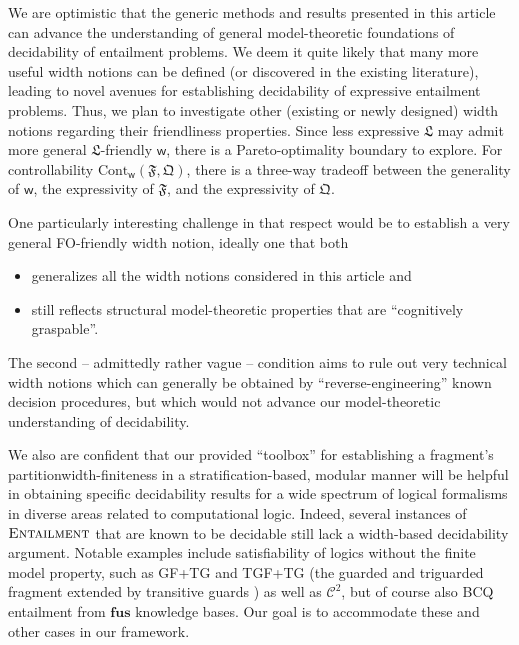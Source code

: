 \documentclass[10pt,a4paper]{amsart}
\theoremstyle{definition}
\numberwithin{equation}{section}
\theoremstyle{plain}
\theoremstyle{definition}
\theoremstyle{myexample}
\theoremstyle{plain}
\theoremstyle{definition}
\newcommand{\fcn}[1]{\mathsf{#1}}
\newcommand{\fus}{\mathbf{fus}}
\begin{document}
We are optimistic that the generic methods and results presented in this article can advance the understanding of general model-theoretic foundations of decidability of entailment problems. We deem it quite likely that many more useful width notions can be defined (or discovered in the existing literature), leading to novel avenues for establishing decidability of expressive entailment problems. Thus, we plan to investigate other (existing or newly designed) width notions regarding their friendliness properties. Since less expressive $\mathfrak{L}$ may admit more general $\mathfrak{L}$-friendly $\fcn{w}$, there is a Pareto-optimality boundary to explore. For controllability $\mathrm{Cont}_\fcn{w}(\mathfrak{F},\mathfrak{Q})$, there is a three-way tradeoff between the generality of $\fcn{w}$, the expressivity of $\mathfrak{F}$, and the expressivity of $\mathfrak{Q}$. 

\smallskip

One particularly interesting challenge in that respect would be to establish a very general FO-friendly width notion, ideally one that both 
\begin{itemize}
\item
generalizes all the width notions considered in this article and 
\item
still reflects structural model-theoretic properties that are ``cognitively graspable''.
\end{itemize}
The second -- admittedly rather vague -- condition aims to rule out very technical width notions which can generally be obtained by ``reverse-engineering'' known decision procedures, but which would not advance our model-theoretic understanding of decidability.  

\medskip

We also are confident that our provided ``toolbox'' for establishing a fragment's partition\-width-finiteness in a stratification-based, modular manner will be helpful in obtaining specific decidability results for a wide spectrum of logical formalisms in diverse areas related to computational logic. 
Indeed, several instances of $\textsc{Entailment}$ that are known to be decidable still lack a width-based decidability argument. Notable examples include satisfiability of logics without the finite model property, such as 
GF+TG and TGF+TG (the guarded and triguarded fragment extended by transitive guards \cite{SzwastT04,KieronskiM20}) as well as $\mathcal{C}^2$, but of course also BCQ entailment from $\fus$ knowledge bases. Our goal is to accommodate these and other cases in our framework.
\end{document}
